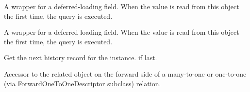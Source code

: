 \documentclass[letterpaper,10pt,english]{sphinxmanual}
\begin{document}
\begin{fulllineitems}

\begin{fulllineitems}
\label{\detokenize{modules/models:gestion.models.HistoricalKeg.is_active}}
A wrapper for a deferred-loading field. When the value is read from this
object the first time, the query is executed.

\end{fulllineitems}


\begin{fulllineitems}
\label{\detokenize{modules/models:gestion.models.HistoricalKeg.name}}
A wrapper for a deferred-loading field. When the value is read from this
object the first time, the query is executed.

\end{fulllineitems}


\begin{fulllineitems}
\label{\detokenize{modules/models:gestion.models.HistoricalKeg.next_record}}
Get the next history record for the instance.  if last.

\end{fulllineitems}


\begin{fulllineitems}
\label{\detokenize{modules/models:gestion.models.HistoricalKeg.objects}}
\end{fulllineitems}


\begin{fulllineitems}
\label{\detokenize{modules/models:gestion.models.HistoricalKeg.pinte}}
Accessor to the related object on the forward side of a many-to-one or
one-to-one (via ForwardOneToOneDescriptor subclass) relation.


\end{fulllineitems}
\end{fulllineitems}
\end{document}
